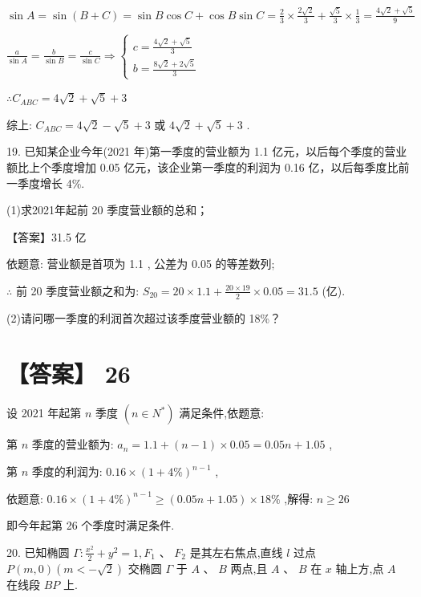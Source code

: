 \documentclass[10pt]{article}
\begin{document}
\(\sin A = \sin \left( {B + C}\right)  = \sin B\cos C + \cos B\sin C = \frac{2}{3} \times  \frac{2\sqrt{2}}{3} + \frac{\sqrt{5}}{3} \times  \frac{1}{3} = \frac{4\sqrt{2} + \sqrt{5}}{9}\)

\(\frac{a}{\sin A} = \frac{b}{\sin B} = \frac{c}{\sin C} \Rightarrow  \left\{  \begin{array}{l} c = \frac{4\sqrt{2} + \sqrt{5}}{3} \\  b = \frac{8\sqrt{2} + 2\sqrt{5}}{3} \end{array}\right.\)

\(\therefore {C}_{ABC} = 4\sqrt{2} + \sqrt{5} + 3\)

综上: \({C}_{ABC} = 4\sqrt{2} - \sqrt{5} + 3\) 或 \(4\sqrt{2} + \sqrt{5} + 3\) .

19. 已知某企业今年(2021 年)第一季度的营业额为 1.1 亿元，以后每个季度的营业额比上个季度增加 0.05 亿元，该企业第一季度的利润为 0.16 亿，以后每季度比前一季度增长 4\%.

(1)求2021年起前 20 季度营业额的总和；

【答案】31.5 亿

依题意: 营业额是首项为 1.1 , 公差为 0.05 的等差数列;

\(\therefore\) 前 20 季度营业额之和为: \({S}_{20} = {20} \times  {1.1} + \frac{{20} \times  {19}}{2} \times  {0.05} = {31.5}\) (亿).

(2)请问哪一季度的利润首次超过该季度营业额的 18\%？

\section*{【答案】 26}

设 2021 年起第 \(n\) 季度 \(\left( {n \in  {N}^{ * }}\right)\) 满足条件,依题意:

第 \(n\) 季度的营业额为: \({a}_{n} = {1.1} + \left( {n - 1}\right)  \times  {0.05} = {0.05n} + {1.05}\) ,

第 \(n\) 季度的利润为: \({0.16} \times  {\left( 1 + 4\% \right) }^{n - 1}\) ,

依题意: \({0.16} \times  {\left( 1 + 4\% \right) }^{n - 1} \geq  \left( {{0.05n} + {1.05}}\right)  \times  {18}\%\) ,解得: \(n \geq  {26}\)

即今年起第 26 个季度时满足条件.

20. 已知椭圆 \(\Gamma  : \frac{{x}^{2}}{2} + {y}^{2} = 1,{F}_{1}\text{ 、 }{F}_{2}\) 是其左右焦点,直线 \(l\) 过点 \(P\left( {m,0}\right) \left( {m <  - \sqrt{2}}\right)\) 交椭圆 \(\Gamma\) 于 \(A\text{ 、 }B\) 两点,且 \(A\text{ 、 }B\) 在 \(x\) 轴上方,点 \(A\) 在线段 \({BP}\) 上.
\end{document}
